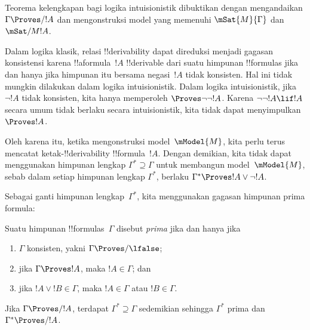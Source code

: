 \documentclass[../../../include/open-logic-section]{subfiles}
\begin{document}


Teorema kelengkapan bagi logika intuisionistik dibuktikan dengan mengandaikan
$\Gamma \Proves/ !A$ dan mengonstruksi model yang memenuhi
$\mSat{M}{\Gamma}$ dan~$\mSat/{M}{!A}$.

Dalam logika klasik, relasi !!{derivability} dapat direduksi menjadi gagasan
konsistensi karena !!a{formula}~$!A$ !!{derivable} dari suatu himpunan
!!{formula}s jika dan hanya jika himpunan itu bersama negasi~$!A$ tidak
konsisten. Hal ini tidak mungkin dilakukan dalam logika intuisionistik. Dalam
logika intuisionistik, jika $\lnot!A$ tidak konsisten, kita hanya memperoleh
$\Proves \lnot\lnot !A$. Karena $\lnot\lnot!A \lif !A$ secara umum tidak
berlaku secara intuisionistik, kita tidak dapat menyimpulkan
$\Proves !A$.

Oleh karena itu, ketika mengonstruksi model~$\mModel{M}$, kita perlu terus
mencatat ketak-!!{derivability} !!{formula}~$!A$. Dengan demikian, kita tidak
dapat menggunakan himpunan lengkap $\Gamma^* \supseteq \Gamma$ untuk
membangun model~$\mModel{M}$, sebab dalam setiap himpunan lengkap
$\Gamma^*$, berlaku $\Gamma^* \Proves !A \lor \lnot !A$.

Sebagai ganti himpunan lengkap~$\Gamma^*$, kita menggunakan gagasan himpunan
prima formula:

\begin{defn}
  Suatu himpunan !!{formula}s~$\Gamma$ disebut 
  \emph{prima} jika dan hanya jika
  \begin{enumerate}
  \item{} $\Gamma$ konsisten, yakni
    $\Gamma \Proves/ \lfalse$;
  \item{} jika $\Gamma \Proves !A$, maka
    $!A \in \Gamma$; dan
  \item{} jika $!A \lor !B \in \Gamma$, maka
    $!A \in \Gamma$ atau $!B \in \Gamma$.
  \end{enumerate}
\end{defn}

\begin{lem}
   Jika $\Gamma \Proves/ !A$, terdapat
  $\Gamma^* \supseteq \Gamma$ sedemikian sehingga $\Gamma^*$ prima dan
  $\Gamma^* \Proves/ !A$.
\end{lem}
\end{document}
